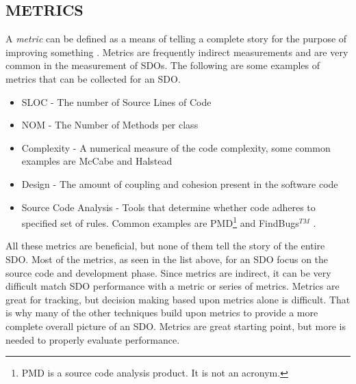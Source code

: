\documentclass[SDSUThesis.tex]{subfiles}
\begin{document}
    \subsection{METRICS}
        A \textit{metric} can be defined as a means of telling a complete story
        for the purpose of improving something \cite{Klubeck2011}.  Metrics are
        frequently indirect measurements and
        are very common in the measurement of SDOs.  
        The following are some examples of metrics that can be collected 
        for an SDO. 
        \begin{itemize}
            \item SLOC - The number of Source Lines of Code 
            \item NOM - The Number of Methods per class
            \item Complexity - A numerical measure of the code complexity,
                some common examples are McCabe \cite{McCabe1976} and 
                Halstead \cite{Halstead1977}
            \item Design - The amount of coupling and cohesion present 
                in the software code
            \item Source Code Analysis - Tools that determine whether 
                code adheres to specified set of rules. Common 
                examples are PMD\footnote{PMD is a source code analysis product.  
                It is not an acronym.} and FindBugs$^{TM}$ \cite{PMD, Findbugs}.
        \end{itemize}
        All these metrics are beneficial, but none of them tell the story of the entire
        SDO.  Most of the metrics, as seen in the list above, for an SDO focus on 
        the source code and development phase. 
        Since metrics are indirect, it can be very difficult match SDO performance with
        a metric or series of metrics.  Metrics are great for tracking, but decision making
        based upon metrics alone is difficult.  That is why many of the other techniques
        build upon metrics to provide a more complete overall picture of an SDO. Metrics are great starting point, but more is needed to properly 
        evaluate performance. 
\end{document}
